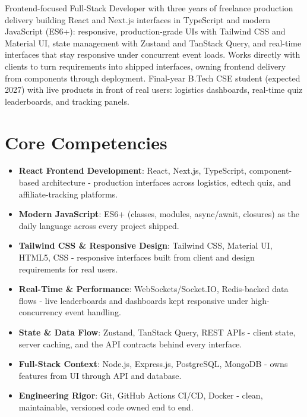 \documentclass[11pt,a4paper,sans]{moderncv}
\begin{document}
\makecvtitle


\vspace{6pt}
\small{Frontend-focused Full-Stack Developer with three years of freelance production delivery building React and Next.js interfaces in TypeScript and modern JavaScript (ES6+): responsive, production-grade UIs with Tailwind CSS and Material UI, state management with Zustand and TanStack Query, and real-time interfaces that stay responsive under concurrent event loads. Works directly with clients to turn requirements into shipped interfaces, owning frontend delivery from components through deployment. Final-year B.Tech CSE student (expected 2027) with live products in front of real users: logistics dashboards, real-time quiz leaderboards, and tracking panels.}


\section{Core Competencies}
\vspace{1pt}
\begin{itemize}

\item \textbf{React Frontend Development}: React, Next.js, TypeScript, component-based architecture - production interfaces across logistics, edtech quiz, and affiliate-tracking platforms.

\item \textbf{Modern JavaScript}: ES6+ (classes, modules, async/await, closures) as the daily language across every project shipped.

\item \textbf{Tailwind CSS \& Responsive Design}: Tailwind CSS, Material UI, HTML5, CSS - responsive interfaces built from client and design requirements for real users.

\item \textbf{Real-Time \& Performance}: WebSockets/Socket.IO, Redis-backed data flows - live leaderboards and dashboards kept responsive under high-concurrency event handling.

\item \textbf{State \& Data Flow}: Zustand, TanStack Query, REST APIs - client state, server caching, and the API contracts behind every interface.

\item \textbf{Full-Stack Context}: Node.js, Express.js, PostgreSQL, MongoDB - owns features from UI through API and database.

\item \textbf{Engineering Rigor}: Git, GitHub Actions CI/CD, Docker - clean, maintainable, versioned code owned end to end.

\end{itemize}
\end{document}
